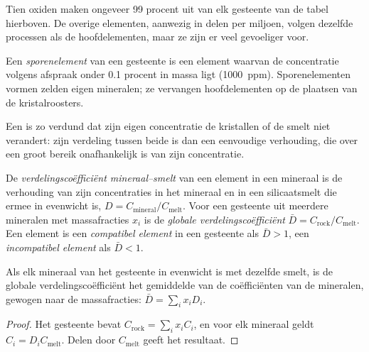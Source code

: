 Tien oxiden maken ongeveer 99 procent uit van elk gesteente van de tabel hierboven. De overige elementen,
aanwezig in delen per miljoen, volgen dezelfde processen als de hoofdelementen, maar
ze zijn er veel gevoeliger voor.

\begin{definition}[Sporenelement]\label{def:b2:elements-in-the-earth:trace}
Een \emph{sporenelement} van een gesteente is een element waarvan de
concentratie volgens afspraak onder 0.1 procent in massa ligt (\qty{1000}{ppm}).
Sporenelementen vormen zelden eigen mineralen; ze vervangen hoofdelementen
op de plaatsen van de kristalroosters.
\end{definition}

Een  is zo verdund dat zijn eigen concentratie de kristallen of de smelt
niet verandert: zijn verdeling tussen beide is dan een eenvoudige verhouding,
die over een groot bereik onafhankelijk is van zijn concentratie.

\begin{definition}\label{def:b2:elements-in-the-earth:partition}
De \emph{verdelingscoëfficiënt mineraal--smelt}
van een element in een mineraal is de verhouding van zijn concentraties in het
mineraal en in een silicaatsmelt die ermee in evenwicht is,
$D = C_{\mathrm{mineral}}/C_{\mathrm{melt}}$. Voor een gesteente uit meerdere mineralen met
massafracties $x_i$ is de \emph{globale verdelingscoëfficiënt}
$\bar D = C_{\mathrm{rock}}/C_{\mathrm{melt}}$. Een element is een
\emph{compatibel element} in een gesteente als $\bar D > 1$,
een \emph{incompatibel element} als $\bar D < 1$.
\end{definition}

\begin{proposition}
\label{prop:b2:elements-in-the-earth:bulk-d}
Als elk mineraal van het gesteente in evenwicht is met dezelfde smelt, is de globale
verdelingscoëfficiënt het gemiddelde van de coëfficiënten van de mineralen, gewogen naar
de massafracties: $\bar D = \sum_i x_i D_i$.
\end{proposition}

\begin{proof}
Het gesteente bevat $C_{\mathrm{rock}} = \sum_i x_i C_i$, en voor elk mineraal geldt
$C_i = D_i C_{\mathrm{melt}}$. Delen door $C_{\mathrm{melt}}$ geeft het resultaat.
\end{proof}


